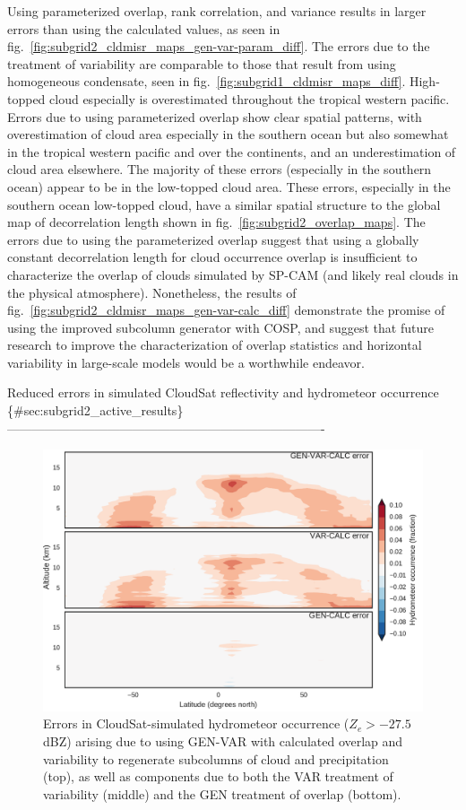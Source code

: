 Using parameterized overlap, rank correlation, and variance results in
larger errors than using the calculated values, as seen in
fig.~\ref{fig:subgrid2_cldmisr_maps_gen-var-param_diff}. The errors due
to the treatment of variability are comparable to those that result from
using homogeneous condensate, seen in
fig.~\ref{fig:subgrid1_cldmisr_maps_diff}. High-topped cloud especially
is overestimated throughout the tropical western pacific. Errors due to
using parameterized overlap show clear spatial patterns, with
overestimation of cloud area especially in the southern ocean but also
somewhat in the tropical western pacific and over the continents, and an
underestimation of cloud area elsewhere. The majority of these errors
(especially in the southern ocean) appear to be in the low-topped cloud
area. These errors, especially in the southern ocean low-topped cloud,
have a similar spatial structure to the global map of decorrelation
length shown in fig.~\ref{fig:subgrid2_overlap_maps}. The errors due to
using the parameterized overlap suggest that using a globally constant
decorrelation length for cloud occurrence overlap is insufficient to
characterize the overlap of clouds simulated by SP-CAM (and likely real
clouds in the physical atmosphere). Nonetheless, the results of
fig.~\ref{fig:subgrid2_cldmisr_maps_gen-var-calc_diff} demonstrate the
promise of using the improved subcolumn generator with COSP, and suggest
that future research to improve the characterization of overlap
statistics and horizontal variability in large-scale models would be a
worthwhile endeavor.

Reduced errors in simulated CloudSat reflectivity and hydrometeor
occurrence \{\#sec:subgrid2\_active\_results\}
----------------------------------------------------------------------------

\begin{figure}[htbp]
\centering
\includegraphics{graphics/subgrid2_hfba_zonal_gen-var-calc_diff.pdf}
\caption{\label{fig:subgrid2_hfba_zonal_diff}Errors in
CloudSat-simulated hydrometeor occurrence (\(Z_e > -27.5\) dBZ) arising
due to using GEN-VAR with calculated overlap and variability to
regenerate subcolumns of cloud and precipitation (top), as well as
components due to both the VAR treatment of variability (middle) and the
GEN treatment of overlap
(bottom).}\label{fig:subgrid2ux5fhfbaux5fzonalux5fdiff}
\end{figure}

